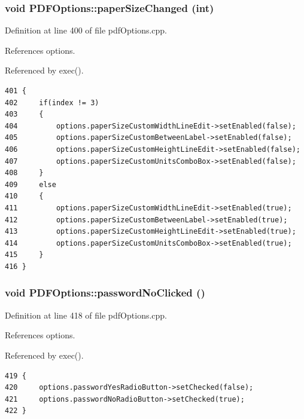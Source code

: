 \hypertarget{classPDFOptions_k0}{
\subsubsection[paperSizeChanged]{\setlength{\rightskip}{0pt plus 5cm}void PDFOptions::paper\-Size\-Changed (int)}}
\label{classPDFOptions_k0}


Definition at line 400 of file pdf\-Options.cpp.

References options.

Referenced by exec().

\footnotesize\begin{verbatim}401 {
402     if(index != 3)
403     {
404         options.paperSizeCustomWidthLineEdit->setEnabled(false);
405         options.paperSizeCustomBetweenLabel->setEnabled(false);
406         options.paperSizeCustomHeightLineEdit->setEnabled(false);
407         options.paperSizeCustomUnitsComboBox->setEnabled(false);
408     }
409     else
410     {
411         options.paperSizeCustomWidthLineEdit->setEnabled(true);
412         options.paperSizeCustomBetweenLabel->setEnabled(true);
413         options.paperSizeCustomHeightLineEdit->setEnabled(true);
414         options.paperSizeCustomUnitsComboBox->setEnabled(true);
415     }
416 }
\end{verbatim}\normalsize 


\hypertarget{classPDFOptions_k1}{
\subsubsection[passwordNoClicked]{\setlength{\rightskip}{0pt plus 5cm}void PDFOptions::password\-No\-Clicked ()}}
\label{classPDFOptions_k1}


Definition at line 418 of file pdf\-Options.cpp.

References options.

Referenced by exec().

\footnotesize\begin{verbatim}419 {
420     options.passwordYesRadioButton->setChecked(false);
421     options.passwordNoRadioButton->setChecked(true);
422 }
\end{verbatim}\normalsize 


